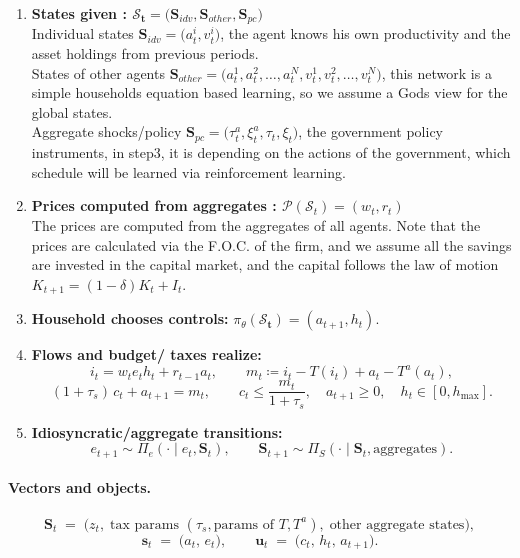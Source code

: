\documentclass[11pt]{article}
\begin{document}
\begin{enumerate}
  \item \textbf{States given : $\mathbf{\mathcal{S}_t}=\big( \mathbf{S}_{idv}, \mathbf{S}_{other}, \mathbf{S}_{pc} \big)$} \\
   Individual states $\mathbf{S}_{idv} = \big(a_t^i,v_t^i\big)$, the agent knows his own productivity and the asset holdings from previous periods.\\
   States of other agents $\mathbf{S}_{other} = \big( a_t^1, a_t^2, \ldots, a_t^N, v_t^1, v_t^2, \ldots, v_t^N \big)$, this network is a simple households equation based learning, so we assume a Gods view for the global states.\\
   Aggregate shocks/policy $\mathbf{S}_{pc} = \big( \tau_t^a, \xi_t^a ,\tau_t, \xi_t \big)$, the government policy instruments, in step3, it is depending on the actions of the government, which schedule will be learned via reinforcement learning.
  \item \textbf{Prices computed from aggregates : $\mathcal{P}(\mathcal{S}_t) = (w_t,r_{t})$} \\
  The prices are computed from the aggregates of all agents. 
  Note that the prices are calculated via the F.O.C. of the firm, and we assume all the savings are invested in the capital market, and the capital follows the law of motion $K_{t+1} = (1-\delta)K_t + I_t$.
  \item \textbf{Household chooses controls:} $\pi_\theta(\mathbf{\mathcal{S}_t})=(a_{t+1}, h_t)$.
  \item \textbf{Flows and budget/ taxes realize:}
  \[
    i_t = w_t e_t h_t + r_{t-1} a_t,\qquad
    m_t \coloneqq i_t - T(i_t) + a_t - T^{a}(a_t),
  \]
  \[
    (1+\tau_s)\,c_t + a_{t+1} = m_t,\qquad c_t \le \frac{m_t}{1+\tau_s},\quad a_{t+1}\ge 0,\quad h_t\in[0,h_{\max}].
  \]
  \item \textbf{Idiosyncratic/aggregate transitions:}
  \[
    e_{t+1}\sim \Pi_e(\cdot\mid e_t,\mathbf{S}_t),\qquad
    \mathbf{S}_{t+1} \sim \Pi_S(\cdot\mid \mathbf{S}_t,\text{aggregates}).
  \]
\end{enumerate}

\paragraph{Vectors and objects.}
\[
\mathbf{S}_t \;=\; \big(z_t,\;\text{tax params }(\tau_s,\text{params of }T, T^a),\;\text{other aggregate states}\big),
\]
\[
\mathbf{s}_t \;=\; \big(a_t,\,e_t\big), \qquad
\mathbf{u}_t \;=\; \big(c_t,\,h_t,\,a_{t+1}\big).
\]
\end{document}
